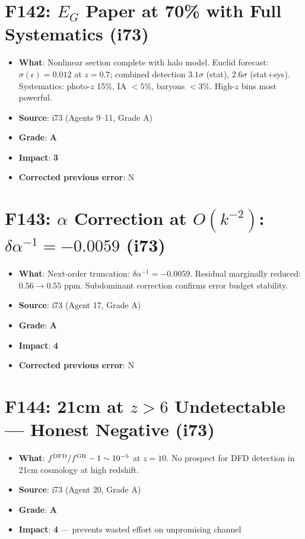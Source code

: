 \documentclass[11pt,a4paper]{article}
\newcommand{\grade}[1]{\textbf{#1}}
\newcommand{\impact}[1]{\textbf{#1}}
\begin{document}
\section{F142: $E_G$ Paper at 70\% with Full Systematics (i73)}
\begin{itemize}[nosep]
\item \textbf{What}: Nonlinear section complete with halo model. Euclid forecast: $\sigma(\epsilon) = 0.012$ at $z = 0.7$; combined detection $3.1\sigma$ (stat), $2.6\sigma$ (stat+sys). Systematics: photo-$z$ 15\%, IA $< 5\%$, baryons $< 3\%$. High-$z$ bins most powerful.
\item \textbf{Source}: i73 (Agents 9--11, Grade A)
\item \textbf{Grade}: \grade{A}
\item \textbf{Impact}: \impact{3}
\item \textbf{Corrected previous error}: N
\end{itemize}

\section{F143: $\alpha$ Correction at $O(k^{-2})$: $\delta\alpha^{-1} = -0.0059$ (i73)}
\begin{itemize}[nosep]
\item \textbf{What}: Next-order truncation: $\delta\alpha^{-1} = -0.0059$. Residual marginally reduced: $0.56 \to 0.55$ ppm. Subdominant correction confirms error budget stability.
\item \textbf{Source}: i73 (Agent 17, Grade A)
\item \textbf{Grade}: \grade{A}
\item \textbf{Impact}: \impact{4}
\item \textbf{Corrected previous error}: N
\end{itemize}

\section{F144: 21cm at $z > 6$ Undetectable --- Honest Negative (i73)}
\begin{itemize}[nosep]
\item \textbf{What}: $f^{\rm DFD}/f^{\rm GR} - 1 \sim 10^{-5}$ at $z = 10$. No prospect for DFD detection in 21cm cosmology at high redshift.
\item \textbf{Source}: i73 (Agent 20, Grade A)
\item \textbf{Grade}: \grade{A}
\item \textbf{Impact}: \impact{4} --- prevents wasted effort on unpromising channel
\end{itemize}
\end{document}
